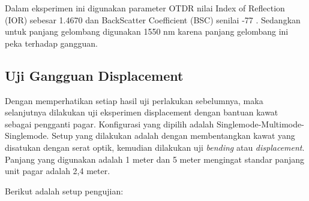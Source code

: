 \documentclass[12pt]{article}
\begin{document}
	Dalam eksperimen ini digunakan parameter OTDR nilai Index of Reflection (IOR) sebesar 1.4670 dan BackScatter Coefficient (BSC) senilai -77 \cite{Hafid2014}.
	Sedangkan untuk panjang gelombang digunakan 1550 nm karena panjang gelombang ini peka terhadap gangguan. 

	\subsection{Uji Gangguan Displacement}
	
	Dengan memperhatikan setiap hasil uji perlakukan sebelumnya, maka selanjutnya dilakukan uji eksperimen displacement dengan bantuan kawat sebagai pengganti pagar. 
	Konfigurasi yang dipilih adalah Singlemode-Multimode-Singlemode.
	Setup yang dilakukan adalah dengan membentangkan kawat yang disatukan dengan serat optik, kemudian dilakukan uji \textit{bending} atau \textit{displacement}.\cite{Tian2017}\cite{Gong2011}\cite{Arifin2015} 
	Panjang yang digunakan adalah 1 meter dan 5 meter mengingat standar panjang unit pagar adalah 2,4 meter.\cite{Pagar2015}
	
	Berikut adalah setup pengujian:
	
\end{document}
